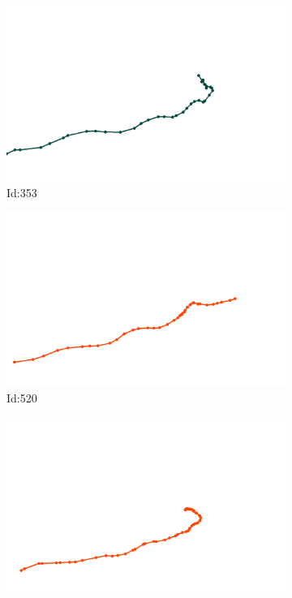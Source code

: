 \documentclass[12pt,twoside]{report}
\begin{document}
\begin{figure}
\centering
\begin{subfigure}[b]{0.20\textwidth}
\centering
\includegraphics[width=\textwidth]{../../trajectories/353.png}
\caption{Id:353}
\end{subfigure}
\begin{subfigure}[b]{0.20\textwidth}
\centering
\includegraphics[width=\textwidth]{../../trajectories/520.png}
\caption{Id:520}
\end{subfigure}
\begin{subfigure}[b]{0.20\textwidth}
\centering
\includegraphics[width=\textwidth]{../../trajectories/590.png}

\end{subfigure}
\end{figure}
\end{document}
